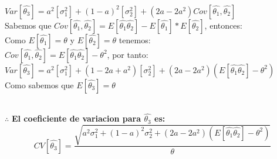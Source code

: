 \documentclass[letterpaper,12pt,onecolumn,titlepage]{article}
\begin{document}
~\\ $Var[\hat{\theta_3}]=a^2[\sigma_1^2]+(1-a)^2[\sigma_2^2]+(2a-2a^2)Cov[{\hat{\theta_1}},{\hat{\theta_2}}]$
~\\ Sabemos que $Cov[{\hat{\theta_1}},{\hat{\theta_2}}]= E[{\hat{\theta_1}}{\hat{\theta_2}}]- E[{\hat{\theta_1}}]*E[{\hat{\theta_2}}]$, entonces:
~\\ Como $E[{\hat{\theta_1}}]={\theta}$ y $E[{\hat{\theta_2}}]={\theta}$ tenemos:
~\\ $Cov[{\hat{\theta_1}},{\hat{\theta_2}}]=E[{\hat{\theta_1}}{\hat{\theta_2}}]-{\theta^2}$, por tanto:
~\\ $Var[\hat{\theta_3}]=a^2[\sigma_1^2]+(1-2a+a^2)[\sigma_2^2]+(2a-2a^2)(E[{\hat{\theta_1}}{\hat{\theta_2}}]-{\theta^2})$
~\\ Como sabemos que $E[\hat{\theta_3}]={\theta}$

~\\$\therefore$ \textbf{El coeficiente de variacion para $\hat{\theta_3}$ es:}  
$$CV[\hat{\theta_3}]=\frac{\sqrt{a^2\sigma_1^2+(1-a)^2\sigma_2^2+(2a-2a^2)(E[{\hat{\theta_1}}{\hat{\theta_2}}]-{\theta^2})}}{{\theta}}$$
\end{document}

